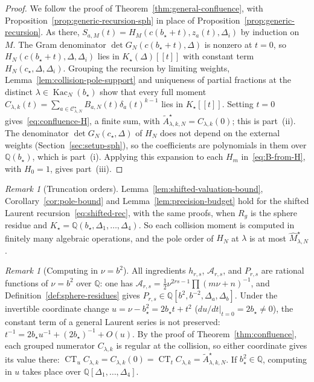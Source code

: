 \documentclass[twoside,10pt]{article}
\numberwithin{equation}{section}
\theoremstyle{slbody}
\theoremstyle{definition}
\theoremstyle{remark}
\newtheorem{remark}[theorem]{Remark}
\newcommand{\CT}{\operatorname{CT}}
\begin{document}
\begin{proof}
We follow the proof of Theorem~\ref{thm:general-confluence}, with
Proposition~\ref{prop:generic-recursion-sph} in place of
Proposition~\ref{prop:generic-recursion}.  As there,
\(S_{a,M}(t)=H_M(c(b_\star+t),z_a(t),\Delta_i)\) by induction on \(M\).  The
Gram denominator \(\det G_N(c(b_\star+t),\Delta)\) is nonzero at \(t=0\), so
\(H_N(c(b_\star+t),\Delta,\Delta_i)\) lies in \(K_\star(\Delta)[[t]]\) with
constant term \(H_N(c_\star,\Delta,\Delta_i)\).  Grouping the recursion by
limiting weights, Lemma~\ref{lem:collision-pole-support} and uniqueness of
partial fractions at the distinct \(\lambda\in\operatorname{Kac}_N(b_\star)\)
show that every full moment
\(C_{\lambda,k}(t)=\sum_{a\in\mathcal C^\star_{\lambda,N}}B_{a,N}(t)\delta_a(t)^{k-1}\)
lies in \(K_\star[[t]]\).  Setting \(t=0\) gives~\eqref{eq:confluence-H}, a
finite sum, with \(\widetilde A^\star_{\lambda,k,N}=C_{\lambda,k}(0)\); this is
part~(ii).  The denominator \(\det G_N(c_\star,\Delta)\) of \(H_N\) does not
depend on the external weights (Section~\ref{sec:setup-sph}), so the
coefficients are polynomials in them over \(\mathbb Q(b_\star)\), which is
part~(i).  Applying this expansion to each \(H_m\) in~\eqref{eq:B-from-H}, with
\(H_0=1\), gives part~(iii).
\end{proof}

\begin{remark}[Truncation orders]\label{rem:sph-truncation}
Lemma~\ref{lem:shifted-valuation-bound}, Corollary~\ref{cor:pole-bound} and
Lemma~\ref{lem:precision-budget} hold for the shifted Laurent
recursion~\eqref{eq:shifted-rec}, with the same proofs, when \(R_g\) is the
sphere residue and \(K_\star=\mathbb Q(b_\star,\Delta_1,\dots,\Delta_4)\).
So each collision moment is computed in finitely many algebraic operations,
and the pole order of \(H_N\) at \(\lambda\) is at most
\(\widehat M^\star_{\lambda,N}\).
\end{remark}

\begin{remark}[Computing in \(\nu=b^2\)]\label{rem:nu-parameter}
All ingredients \(h_{r,s}\), \(\mathcal A_{r,s}\), and \(P_{r,s}\) are rational
functions of \(\nu=b^2\) over \(\mathbb Q\): one has
\(\mathcal A_{r,s}=\frac12\nu^{2rs-1}\prod(m\nu+n)^{-1}\), and
Definition~\ref{def:sphere-residues} gives \(P_{r,s}\in\mathbb Q[b^2,b^{-2},\Delta_a,\Delta_b]\).
Under the invertible coordinate change \(u=\nu-b_\star^2=2b_\star t+t^2\)
(\(du/dt|_{t=0}=2b_\star\neq0\)), the constant term of a general Laurent series
is not preserved: \(t^{-1}=2b_\star u^{-1}+(2b_\star)^{-1}+O(u)\).  By the proof of Theorem~\ref{thm:confluence}, each grouped numerator
\(C_{\lambda,k}\) is regular at the collision, so either coordinate gives its
value there:
\(\CT_u C_{\lambda,k}=C_{\lambda,k}(0)=\CT_t C_{\lambda,k}=\widetilde A^\star_{\lambda,k,N}\).
If \(b_\star^2\in\mathbb Q\), computing in \(u\) takes place over
\(\mathbb Q[\Delta_1,\dots,\Delta_4]\).
\end{remark}
\end{document}
